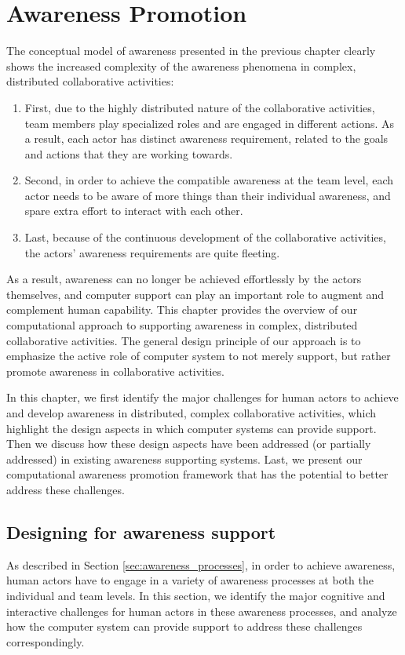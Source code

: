 \graphicspath{{Figures/}}

\chapter{Awareness Promotion} %
\label{cha:awareness_promotion}
The conceptual model of awareness presented in the previous chapter clearly shows the increased complexity of the awareness phenomena in complex, distributed collaborative activities:

\begin{enumerate}
   \item First, due to the highly distributed nature of the collaborative activities, team members play specialized roles and are engaged in different actions. As a result, each actor has distinct awareness requirement, related to the goals and actions that they are working towards.
   \item Second, in order to achieve the compatible awareness at the team level, each actor needs to be aware of more things than their individual awareness, and spare extra effort to interact with each other.
   \item Last, because of the continuous development of the collaborative activities, the actors' awareness requirements are quite fleeting.
\end{enumerate}

As a result, awareness can no longer be achieved effortlessly by the actors themselves, and computer support can play an important role to augment and complement human capability. This chapter provides the overview of our computational approach to supporting awareness in complex, distributed collaborative activities. The general design principle of our approach is to emphasize the active role of computer system to not merely support, but rather promote awareness in collaborative activities.

In this chapter, we first identify the major challenges for human actors to achieve and develop awareness in distributed, complex collaborative activities, which highlight the design aspects in which computer systems can provide support. Then we discuss how these design aspects have been addressed (or partially addressed) in existing awareness supporting systems. Last, we present our computational awareness promotion framework that has the potential to better address these challenges.

\section{Designing for awareness support} %
\label{sec:designing_for_awareness_support}
As described in Section \ref{sec:awareness_processes}, in order to achieve awareness, human actors have to engage in a variety of awareness processes at both the individual and team levels. In this section, we identify the major cognitive and interactive challenges for human actors in these awareness processes, and analyze how the computer system can provide support to address these challenges correspondingly.

